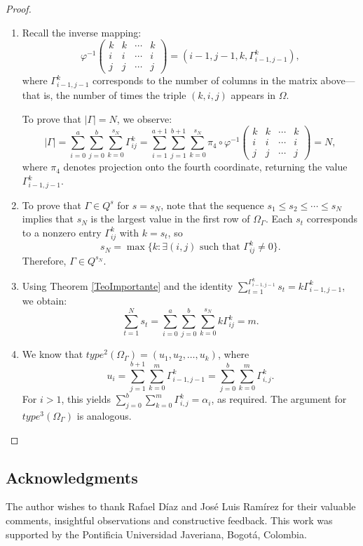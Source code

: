 \documentclass[11pt]{article}
\begin{document}
\begin{proof}
\begin{enumerate}
    \item Recall the inverse mapping:
    \[
    \varphi^{-1}
    \begin{pmatrix}
    k & k & \cdots & k \\
    i & i & \cdots & i \\
    j & j & \cdots & j
    \end{pmatrix}
    = (i-1, j-1, k, \Gamma_{i-1, j-1}^{k}),
    \]
    where $\Gamma_{i-1, j-1}^{k}$ corresponds to the number of columns in the matrix above—that is, the number of times the triple $(k, i, j)$ appears in $\Omega$.

    To prove that $|\Gamma| = N$, we observe:
    \[
    |\Gamma| = \sum_{i=0}^{a} \sum_{j=0}^{b} \sum_{k=0}^{s_{N}} \Gamma_{ij}^{k}
    = \sum_{i=1}^{a+1} \sum_{j=1}^{b+1} \sum_{k=0}^{s_{N}} \pi_4 \circ \varphi^{-1}
    \begin{pmatrix}
        k & k & \cdots & k \\
        i & i & \cdots & i \\
        j & j & \cdots & j
    \end{pmatrix} = N,
    \]
    where $\pi_4$ denotes projection onto the fourth coordinate, returning the value $\Gamma_{i-1, j-1}^{k}$.

    \item To prove that $\Gamma \in Q^{s}$ for $s = s_{N}$, note that the sequence $s_1 \leq s_2 \leq \cdots \leq s_{N}$ implies that $s_{N}$ is the largest value in the first row of $\Omega_{\Gamma}$. Each $s_t$ corresponds to a nonzero entry $\Gamma_{ij}^{k}$ with $k = s_t$, so
    \[
    s_{N} = \max \{ k : \exists (i, j) \text{ such that } \Gamma_{ij}^{k} \neq 0 \}.
    \]
    Therefore, $\Gamma \in Q^{s_{N}}$.

    \item Using Theorem \ref{TeoImportante} and the identity $\sum_{t=1}^{\Gamma_{i-1, j-1}^{k}} s_{t} = k \Gamma_{i-1, j-1}^{k}$, we obtain:
    \[
    \sum_{t=1}^{N} s_t = \sum_{i=0}^{a} \sum_{j=0}^{b} \sum_{k=0}^{s_{N}} k \Gamma_{ij}^{k} = m.
    \]

    \item We know that $type^{2}(\Omega_{\Gamma}) = (u_{1}, u_{2}, \ldots, u_{k})$, where
    \[
    u_i = \sum_{j=1}^{b+1} \sum_{k=0}^{m} \Gamma_{i-1, j-1}^{k} = \sum_{j=0}^{b} \sum_{k=0}^{m} \Gamma_{i, j}^{k}.
    \]
    For $i > 1$, this yields $\sum_{j=0}^{b} \sum_{k=0}^{m} \Gamma_{i, j}^{k} = \alpha_i$, as required. The argument for $type^{3}(\Omega_\Gamma)$ is analogous.
\end{enumerate}
\end{proof}

\subsection*{Acknowledgments} 
The author wishes to thank Rafael Díaz and José Luis Ramírez for their valuable comments, insightful observations and constructive feedback. This work was supported by the Pontificia Universidad Javeriana, Bogotá, Colombia.
 
 
\end{document}
